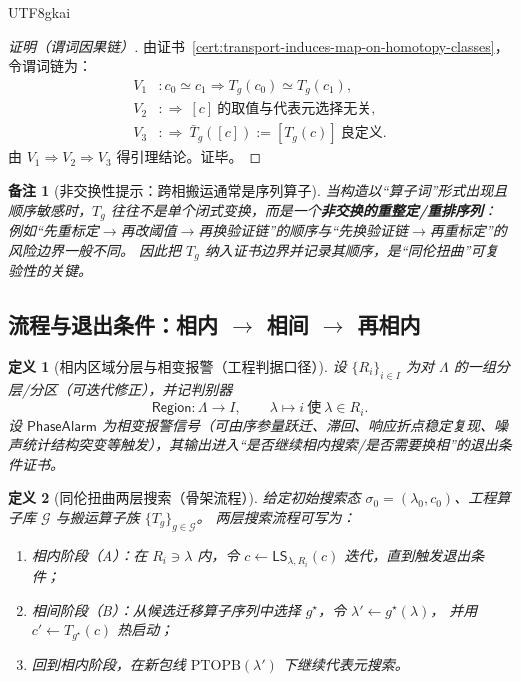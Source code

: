 \documentclass[12pt]{article}
\newtheorem{definition}{定义}[section]
\newtheorem{remark}{备注}[section]
\newcommand{\PTOPB}{\ensuremath{\mathrm{PTOPB}}}
\begin{document}
\begin{CJK*}{UTF8}{gkai}
\begin{proof}[证明（谓词因果链）]
由证书~\ref{cert:transport-induces-map-on-homotopy-classes}，令谓词链为：
\[
\begin{aligned}
  V_1 &: c_0\simeq c_1\Rightarrow T_g(c_0)\simeq T_g(c_1),\\
  V_2 &: \Rightarrow\ [c]\ \text{的取值与代表元选择无关},\\
  V_3 &: \Rightarrow\ \bar T_g([c]):=[T_g(c)]\ \text{良定义}.
\end{aligned}
\]
由 $V_1\Rightarrow V_2\Rightarrow V_3$ 得引理结论。证毕。
\end{proof}

\begin{remark}[非交换性提示：跨相搬运通常是序列算子]
当构造以“算子词”形式出现且顺序敏感时，$T_g$ 往往不是单个闭式变换，而是一个\textbf{非交换的重整定/重排序列}：
例如“先重标定$\to$再改阈值$\to$再换验证链”的顺序与“先换验证链$\to$再重标定”的风险边界一般不同。
因此把 $T_g$ 纳入证书边界并记录其顺序，是“同伦扭曲”可复验性的关键。
\end{remark}

\subsection{流程与退出条件：相内 $\to$ 相间 $\to$ 再相内}
\label{sec:twisted-search-workflow}

\begin{definition}[相内区域分层与相变报警（工程判据口径）]
设 $\{R_i\}_{i\in I}$ 为对 $\Lambda$ 的一组分层/分区（可迭代修正），并记判别器
\[
  \mathsf{Region}:\Lambda\to I,\qquad \lambda\mapsto i\ \text{使}\ \lambda\in R_i.
\]
设 $\mathsf{PhaseAlarm}$ 为相变报警信号（可由序参量跃迁、滞回、响应折点稳定复现、噪声统计结构突变等触发），其输出进入“是否继续相内搜索/是否需要换相”的退出条件证书。
\end{definition}

\begin{definition}[同伦扭曲两层搜索（骨架流程）]
给定初始搜索态 $\sigma_0=(\lambda_0,c_0)$、工程算子库 $\mathcal{G}$ 与搬运算子族 $\{T_g\}_{g\in\mathcal{G}}$。
两层搜索流程可写为：
\begin{enumerate}
  \item 相内阶段（A）：在 $R_i\ni\lambda$ 内，令 $c\leftarrow \mathsf{LS}_{\lambda,R_i}(c)$ 迭代，直到触发退出条件；
  \item 相间阶段（B）：从候选迁移算子序列中选择 $g^\star$，令 $\lambda'\leftarrow g^\star(\lambda)$，
  并用 $c'\leftarrow T_{g^\star}(c)$ 热启动；
  \item 回到相内阶段，在新包线 $\PTOPB(\lambda')$ 下继续代表元搜索。
\end{enumerate}
\end{definition}


\end{CJK*}
\end{document}
